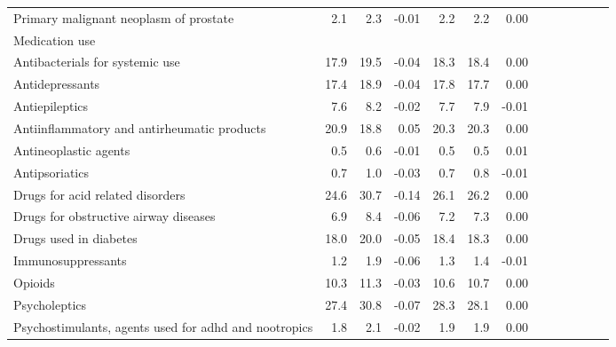\documentclass[11pt,]{article}
\begin{document}
\begin{longtable}{lrrrrrrrrrrrr}
      Primary malignant neoplasm of prostate &  2.1 &   2.3 & -0.01 &  2.2 &   2.2 &  0.00 \\ 
  Medication use &    &     &     &    &     &     \\ 
      Antibacterials for systemic use & 17.9 &  19.5 & -0.04 & 18.3 &  18.4 &  0.00 \\ 
      Antidepressants & 17.4 &  18.9 & -0.04 & 17.8 &  17.7 &  0.00 \\ 
      Antiepileptics &  7.6 &   8.2 & -0.02 &  7.7 &   7.9 & -0.01 \\ 
      Antiinflammatory and antirheumatic products & 20.9 &  18.8 &  0.05 & 20.3 &  20.3 &  0.00 \\ 
      Antineoplastic agents &  0.5 &   0.6 & -0.01 &  0.5 &   0.5 &  0.01 \\ 
      Antipsoriatics &  0.7 &   1.0 & -0.03 &  0.7 &   0.8 & -0.01 \\ 
      Drugs for acid related disorders & 24.6 &  30.7 & -0.14 & 26.1 &  26.2 &  0.00 \\ 
      Drugs for obstructive airway diseases &  6.9 &   8.4 & -0.06 &  7.2 &   7.3 &  0.00 \\ 
      Drugs used in diabetes & 18.0 &  20.0 & -0.05 & 18.4 &  18.3 &  0.00 \\ 
      Immunosuppressants &  1.2 &   1.9 & -0.06 &  1.3 &   1.4 & -0.01 \\ 
      Opioids & 10.3 &  11.3 & -0.03 & 10.6 &  10.7 &  0.00 \\ 
      Psycholeptics & 27.4 &  30.8 & -0.07 & 28.3 &  28.1 &  0.00 \\ 
      Psychostimulants, agents used for adhd and nootropics &  1.8 &   2.1 & -0.02 &  1.9 &   1.9 &  0.00 \\ 
   \bottomrule\end{longtable}
\clearpage
{}
\end{document}
